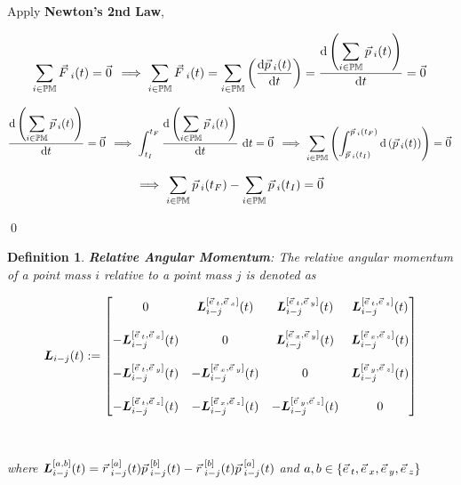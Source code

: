 \documentclass[12pt]{amsart}
\newtheorem{definition}[theorem]{Definition}
\renewenvironment{proof}{{\bfseries Proof.}}{\qed}
\let\oldvec\vec
\renewcommand{\vec}[1]{\oldvec{#1}\hspace{0.1em}}
\begin{document}
\begin{proof}

Apply \textbf{Newton's 2nd Law},

$$ \sum_{i \in \mathbb{PM}} \vec{F}_i(t)=\vec{0} \implies \sum_{i \in \mathbb{PM}} \vec{F}_i(t)= \sum_{i \in \mathbb{PM}} \left(\dfrac{\mathrm{d} \vec{p}_i (t)}{\mathrm{d} t}\right)= \dfrac{\displaystyle \mathrm{d}\left( \sum_{i \in \mathbb{PM}} \vec{p}_i (t)\right)}{\mathrm{d} t} =\vec{0} $$

$$ \dfrac{\displaystyle\mathrm{d}\left( \sum_{i \in \mathbb{PM}} \vec{p}_i (t)\right)}{\mathrm{d} t}=\vec{0} \implies \int_{t_I}^{t_F} \dfrac{\displaystyle \mathrm{d}\left( \sum_{i \in \mathbb{PM}} \vec{p}_i (t)\right)}{\mathrm{d} t} \ \mathrm{d} t = \vec{0} \implies \sum_{i \in \mathbb{PM}} \left( \int_{\vec{p}_{i}(t_I)}^{\vec{p}_{i}(t_F)} \mathrm{d} \left ( \vec{p}_i (t) \right ) \right) = \vec{0} $$

$$ \implies \sum_{i \in \mathbb{PM}} \vec{p}_{i}(t_F) - \sum_{i \in \mathbb{PM}} \vec{p}_{i}(t_I)  = \vec{0} $$

\end{proof}

\begin{definition}
\textbf{Relative Angular Momentum}: The relative angular momentum of a point mass $i$ relative to a point mass $j$ is denoted as 

$$\boldsymbol{L}_{i-j}(t) :=  \begin{bmatrix}
0 & \boldsymbol{L}^{[\vec{e}_t,\vec{e}_x]}_{i-j} (t)& \boldsymbol{L}^{[\vec{e}_t,\vec{e}_y]}_{i-j} (t)& \boldsymbol{L}^{[\vec{e}_t,\vec{e}_z]}_{i-j} (t)\\\\
-\boldsymbol{L}^{[\vec{e}_t,\vec{e}_x]}_{i-j} (t)& 0 & \boldsymbol{L}^{[\vec{e}_x,\vec{e}_y]}_{i-j} (t)& \boldsymbol{L}^{[\vec{e}_x,\vec{e}_z]}_{i-j} (t)\\\\
-\boldsymbol{L}^{[\vec{e}_t,\vec{e}_y]}_{i-j} (t)& -\boldsymbol{L}^{[\vec{e}_x,\vec{e}_y]}_{i-j}(t) & 0 & \boldsymbol{L}^{[\vec{e}_y,\vec{e}_z]}_{i-j} (t)\\\\
-\boldsymbol{L}^{[\vec{e}_t,\vec{e}_z]}_{i-j}(t) & -\boldsymbol{L}^{[\vec{e}_x,\vec{e}_z]}_{i-j} (t)& -\boldsymbol{L}^{[\vec{e}_y,\vec{e}_z]}_{i-j}(t) & 0
\end{bmatrix} $$
\\\\
where $\boldsymbol{L}^{[a,b]}_{i-j} (t) = \vec{r}^{[a]}_{i-j} (t) \vec{p}^{[b]}_{i-j} (t) - \vec{r}^{[b]}_{i-j} (t) \vec{p}^{[a]}_{i-j} (t)$ and $a, b \in \{ \vec{e}_t, \vec{e}_x, \vec{e}_y, \vec{e}_z \}$
\end{definition}
\end{document}
